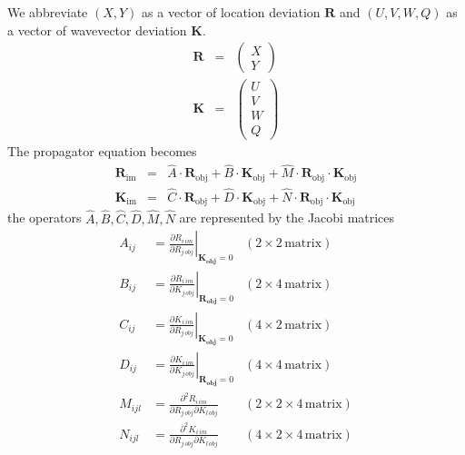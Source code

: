 \documentclass[12pt,a4paper,twoside,openright,BCOR10mm,headsepline,titlepage,abstracton,chapterprefix,final]{scrreprt}
\newcommand\Vector[1]{{\mathbf{#1}}}
\newcommand\im{\textrm{im}}
\newcommand\obj{\textrm{obj}}
\begin{document}
We abbreviate $(X,Y)$ as a vector of location deviation $\Vector{R}$
and $(U,V,W,Q)$ as a vector of wavevector deviation $\Vector{K}$.
\begin{eqnarray}
\Vector{R} &=&
 \begin{pmatrix}
  X \\ Y
 \end{pmatrix}
 \\
 \Vector{K} &=&
 \begin{pmatrix}
  U \\ V \\ W \\ Q 
 \end{pmatrix}
\end{eqnarray}
The propagator equation becomes
\begin{subequations}
\begin{eqnarray}
 \Vector{R}_\im &=& \hat{A} \cdot \Vector{R}_\obj + \hat{B} \cdot \Vector{K}_\obj + \hat{M} \cdot \Vector{R}_\obj \cdot \Vector{K}_\obj\label{eq:xyuv_imaging_equation}\\
 \Vector{K}_\im &=& \hat{C} \cdot \Vector{R}_\obj + \hat{D} \cdot \Vector{K}_\obj + \hat{N} \cdot \Vector{R}_\obj \cdot \Vector{K}_\obj
\end{eqnarray}
\end{subequations}
the operators $\hat{A},\hat{B},\hat{C},\hat{D},\hat{M},\hat{N}$ are represented by the Jacobi matrices
\begin{align}
 A_{ij} &=
   \left.
     \frac{\partial R_{i\,im}}{\partial R_{j\,obj}} 
   \right|_{\Vector{K_\obj}=0}
   & (2\times2 \,\textrm{matrix})
 \\
 B_{ij} &=
   \left.
     \frac{\partial R_{i\,im}}{\partial K_{j\,obj}} 
   \right|_{\Vector{R_\obj}=0}
   & (2\times4 \,\textrm{matrix})
 \\
 C_{ij} &=
   \left.
     \frac{\partial K_{i\,im}}{\partial R_{j\,obj}} 
   \right|_{\Vector{K_\obj}=0}
   & (4\times2 \,\textrm{matrix})
 \\
 D_{ij} &=
   \left.
     \frac{\partial K_{i\,im}}{\partial K_{j\,obj}} 
   \right|_{\Vector{R_\obj}=0}
   & (4\times4 \,\textrm{matrix})
 \\
 M_{ijl} &=
     \frac{\partial^2 R_{i\,im}}{\partial R_{j\,obj}\partial K_{l\,obj}} 
   & (2\times2\times4 \,\textrm{matrix})
 \\
 N_{ijl} &=
     \frac{\partial^2 K_{i\,im}}{\partial R_{j\,obj}\partial K_{l\,obj}} 
   & (4\times2\times4 \,\textrm{matrix})
\end{align}
\end{document}
